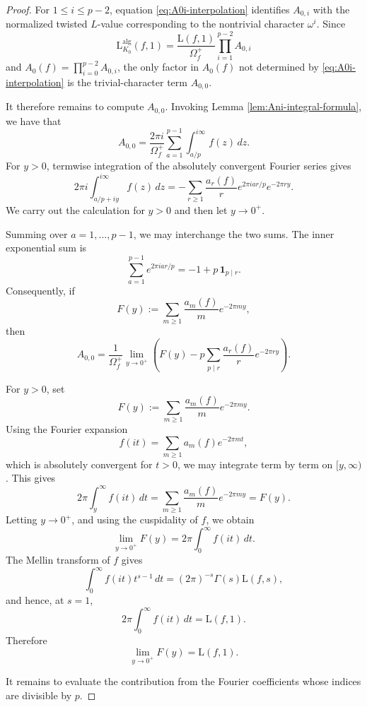 \documentclass[11pt,table]{amsart}
\numberwithin{equation}{section}
\begin{document}
\begin{proof}
For \(1\leq i\leq p-2\), equation
\eqref{eq:A0i-interpolation} identifies \(A_{0,i}\) with the
normalized twisted \(L\)-value corresponding to the nontrivial
character \(\omega^i\). Since
\[
        \mathrm{L}_{K_0}^{\operatorname{alg}}(f,1)
        =
        \frac{\mathrm{L}(f,1)}{\Omega_f^+}
        \prod_{i=1}^{p-2}A_{0,i}
\]
and \(A_0(f)=\prod_{i=0}^{p-2}A_{0,i}\), the only factor in
\(A_0(f)\) not determined by \eqref{eq:A0i-interpolation} is the
trivial-character term \(A_{0,0}\). 
\par It therefore remains to compute
\(A_{0,0}\). Invoking Lemma \ref{lem:Ani-integral-formula}, we have that
\[
        A_{0,0}
        =
        \frac{2\pi i}{\Omega_f^+}
        \sum_{a=1}^{p-1}
        \int_{a/p}^{i\infty}f(z)\,dz.
\]
For \(y>0\), termwise integration
of the absolutely convergent Fourier series gives
\[
        2\pi i
        \int_{a/p+iy}^{i\infty}f(z)\,dz
        =
        -\sum_{r\geq1}
        \frac{a_r(f)}{r}
        e^{2\pi i ar/p}e^{-2\pi ry}.
\]
We carry out the calculation for \(y>0\) and then let \(y\to0^+\).

Summing over \(a=1,\ldots,p-1\), we may interchange the two sums.
The inner exponential sum is
\[
        \sum_{a=1}^{p-1}e^{2\pi i ar/p}
        =
        -1+p\,\mathbf 1_{p\mid r}.
\]
Consequently, if
\[
        F(y)
        :=
        \sum_{m\geq1}\frac{a_m(f)}m e^{-2\pi my},
\]
then
\begin{equation}
\label{eq:A00-first}
        A_{0,0}
        =
        \frac1{\Omega_f^+}
        \lim_{y\to0^+}
        \left(
        F(y)
        -
        p\sum_{p\mid r}
        \frac{a_r(f)}r e^{-2\pi ry}
        \right).
\end{equation}
\par For \(y>0\), set
\[
        F(y)
        :=
        \sum_{m\geq1}\frac{a_m(f)}m e^{-2\pi my}.
\]
Using the Fourier expansion
\[
        f(it)=\sum_{m\geq1}a_m(f)e^{-2\pi mt},
\]
which is absolutely convergent for \(t>0\), we may integrate term by
term on \([y,\infty)\). This gives
\[
        2\pi\int_y^\infty f(it)\,dt
        =
        \sum_{m\geq1}\frac{a_m(f)}m e^{-2\pi my}
        =
        F(y).
\]
Letting \(y\to0^+\), and using the cuspidality of \(f\), we obtain
\[
        \lim_{y\to0^+}F(y)
        =
        2\pi\int_0^\infty f(it)\,dt.
\]
The Mellin transform of \(f\) gives
\[
        \int_0^\infty f(it)t^{s-1}\,dt
        =
        (2\pi)^{-s}\Gamma(s)\mathrm{L}(f,s),
\]
and hence, at \(s=1\),
\[
        2\pi\int_0^\infty f(it)\,dt
        =
        \mathrm{L}(f,1).
\]
Therefore
\[
        \lim_{y\to0^+}F(y)=\mathrm{L}(f,1).
\]
\par It remains to
evaluate the contribution from the Fourier coefficients whose indices
are divisible by \(p\).


\end{proof}
\end{document}
